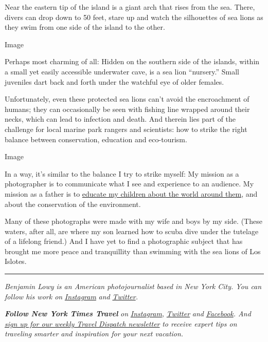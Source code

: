 Near the eastern tip of the island is a giant arch that rises from the
sea. There, divers can drop down to 50 feet, stare up and watch the
silhouettes of sea lions as they swim from one side of the island to the
other.

Image

Perhaps most charming of all: Hidden on the southern side of the
islands, within a small yet easily accessible underwater cave, is a sea
lion ``nursery.'' Small juveniles dart back and forth under the watchful
eye of older females.

Unfortunately, even these protected sea lions can't avoid the
encroachment of humans; they can occasionally be seen with fishing line
wrapped around their necks, which can lead to infection and death. And
therein lies part of the challenge for local marine park rangers and
scientists: how to strike the right balance between conservation,
education and eco-tourism.

Image

In a way, it's similar to the balance I try to strike myself: My mission
as a photographer is to communicate what I see and experience to an
audience. My mission as a father is to
\href{https://vimeo.com/258546007}{educate my children about the world
around them}, and about the conservation of the environment.

Many of these photographs were made with my wife and boys by my side.
(These waters, after all, are where my son learned how to scuba dive
under the tutelage of a lifelong friend.) And I have yet to find a
photographic subject that has brought me more peace and tranquillity
than swimming with the sea lions of Los Islotes.

\begin{center}\rule{0.5\linewidth}{\linethickness}\end{center}

\emph{Benjamin Lowy is an American photojournalist based in New York
City. You can follow his work on}
\href{https://www.instagram.com/benlowy/}{\emph{Instagram}} \emph{and}
\href{https://twitter.com/benlowy}{\emph{Twitter}}\emph{.}

\emph{\textbf{Follow New York Times Travel}} \emph{on}
\href{https://www.instagram.com/nytimestravel/}{\emph{Instagram}}\emph{,}
\href{https://twitter.com/nytimestravel}{\emph{Twitter}} \emph{and}
\href{https://www.facebook.com/nytimestravel/}{\emph{Facebook}}\emph{.
And}
\href{https://www.nytimes.com/newsletters/traveldispatch}{\emph{sign up
for our weekly Travel Dispatch newsletter}} \emph{to receive expert tips
on traveling smarter and inspiration for your next vacation.}

